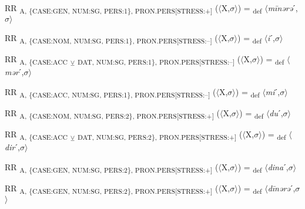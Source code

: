 {\begin{exe}
 RR \textsubscript{A, \{CASE:GEN, NUM:SG, PERS:1\}, PRON.PERS[STRESS:+]} ($\langle$X,$\sigma $$\rangle$) = \textsubscript{def} $\langle$\textit{m\=inərə}ˊ,$\sigma $$\rangle$
\end{exe}

\begin{exe}
 RR \textsubscript{A, \{CASE:NOM, NUM:SG, PERS:1\}, PRON.PERS[STRESS:–]} ($\langle$X,$\sigma $$\rangle$) = \textsubscript{def} $\langle$\textit{i}ˊ,$\sigma $$\rangle$
\end{exe}

\begin{exe}
 RR \textsubscript{A, \{CASE:ACC} \textsubscript{${\veebar}$}\textsubscript{ DAT, NUM:SG, PERS:1\}, PRON.PERS[STRESS:–]} ($\langle$X,$\sigma $$\rangle$) = \textsubscript{def} $\langle$\textit{mər}ˊ,$\sigma $$\rangle$
\end{exe}

\begin{exe}
 RR \textsubscript{A, \{CASE:ACC, NUM:SG, PERS:1\}, PRON.PERS[STRESS:–]} ($\langle$X,$\sigma $$\rangle$) = \textsubscript{def} $\langle$\textit{mi}ˊ,$\sigma $$\rangle$
\end{exe}

\begin{exe}
 RR \textsubscript{A, \{CASE:NOM, NUM:SG, PERS:2\}, PRON.PERS[STRESS:+]} ($\langle$X,$\sigma $$\rangle$) = \textsubscript{def} $\langle$\textit{du}ˊ,$\sigma $$\rangle$
\end{exe}

\begin{exe}
 RR \textsubscript{A, \{CASE:ACC} \textsubscript{${\veebar}$}\textsubscript{ DAT, NUM:SG, PERS:2\}, PRON.PERS[STRESS:+]} ($\langle$X,$\sigma $$\rangle$) = \textsubscript{def} $\langle$\textit{dir}ˊ,$\sigma $$\rangle$
\end{exe}

\begin{exe}
 RR \textsubscript{A, \{CASE:GEN, NUM:SG, PERS:2\}, PRON.PERS[STRESS:+]} ($\langle$X,$\sigma $$\rangle$) = \textsubscript{def} $\langle$\textit{dina}ˊ,$\sigma $$\rangle$
\end{exe}

\begin{exe}
 RR \textsubscript{A, \{CASE:GEN, NUM:SG, PERS:2\}, PRON.PERS[STRESS:+]} ($\langle$X,$\sigma $$\rangle$) = \textsubscript{def} $\langle$\textit{d\=inərə}ˊ,$\sigma $$\rangle$
\end{exe}

}
